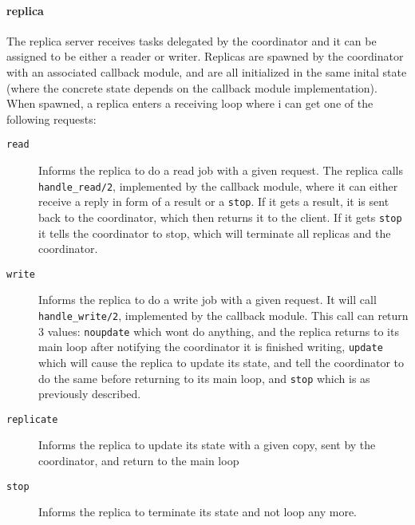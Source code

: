 \documentclass[a4paper]{article}
\begin{document}
\paragraph{replica}
\label{par:replica}
The replica server receives tasks delegated by the coordinator and it can be assigned to be either a reader or writer. Replicas are spawned by the coordinator with an associated callback module, and are all initialized in the same inital state (where the concrete state depends on the callback module implementation). When spawned, a replica enters a receiving loop where i can get one of the following requests:
\begin{description}
  \item[\texttt{read}] Informs the replica to do a read job with a given request. The replica calls \texttt{handle\_read/2}, implemented by the callback module, where it can either receive a reply in form of a result or a \texttt{stop}. If it gets a result, it is sent back to the coordinator, which then returns it to the client. If it gets \texttt{stop} it tells the coordinator to stop, which will terminate all replicas and the coordinator.
  \item[\texttt{write}] Informs the replica to do a write job with a given request. It will call \texttt{handle\_write/2}, implemented by the callback module. This call can return 3 values: \texttt{noupdate} which wont do anything, and the replica returns to its main loop after notifying the coordinator it is finished writing, \texttt{update} which will cause the replica to update its state, and tell the coordinator to do the same before returning to its main loop, and \texttt{stop} which is as previously described.
  \item[\texttt{replicate}] Informs the replica to update its state with a given copy, sent by the coordinator, and return to the main loop
  \item[\texttt{stop}] Informs the replica to terminate its state and not loop any more.
\end{description}
\end{document}
